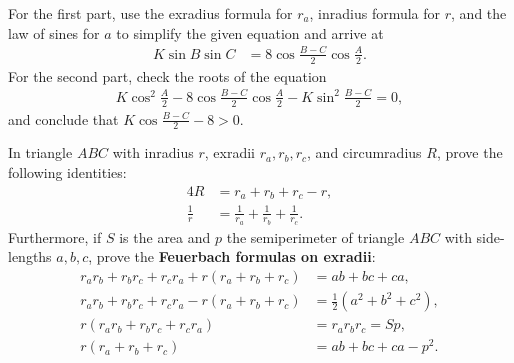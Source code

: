 \begin{solution}
    For the first part, use the exradius formula for $r_a$, inradius formula for $r$, and the law of sines for $a$ to simplify the given equation and arrive at
    \begin{align*}
        K \sin B \sin C &= 8 \cos\frac{B-C}{2} \cos \frac{A}{2}.
    \end{align*}
    For the second part, check the roots of the equation
    \begin{align*}
        K\cos^2 \frac{A}{2} - 8 \cos\frac{B-C}{2} \cos \frac{A}{2} - K \sin^2 \frac{B-C}{2} = 0,
    \end{align*}
    and conclude that $K \cos\frac{B-C}{2} - 8 >0$.
\end{solution}

    \begin{question}[name=Feuerbach Formulas on Exradii]
        In triangle $ABC$ with inradius $r$, exradii $r_a,r_b,r_c$, and circumradius $R$, prove the following identities:
        \begin{align*}
            4R &= r_a + r_b + r_c - r,\\
            \frac{1}{r} &= \frac{1}{r_a} + \frac{1}{r_b} + \frac{1}{r_c}.
        \end{align*}
        Furthermore, if $S$ is the area and $p$ the semiperimeter of triangle $ABC$ with side-lengths $a,b,c$, prove the \textbf{Feuerbach formulas on exradii}:
        \begin{align*}
            r_ar_b+r_br_c+r_cr_a +r(r_a+r_b+r_c) &= ab+bc+ca,\\
            r_ar_b+r_br_c+r_cr_a -r(r_a+r_b+r_c) &= \frac{1}{2}\left(a^2+b^2+c^2\right),\\
            r(r_ar_b+r_br_c+r_cr_a) &= r_ar_br_c = Sp,\\
            r(r_a+r_b+r_c) &= ab+bc+ca - p^2.
        \end{align*}
    \end{question}


